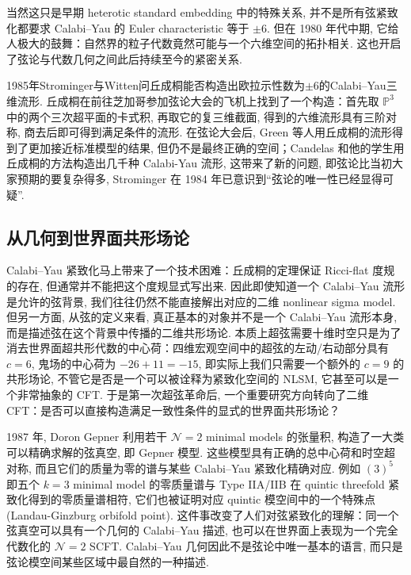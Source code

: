 \documentclass[10pt]{article}
\numberwithin{equation}{section}
\begin{document}
当然这只是早期 heterotic standard embedding 中的特殊关系, 并不是所有弦紧致化都要求 Calabi–Yau 的 Euler characteristic 等于 $\pm6$. 但在 1980 年代中期, 它给人极大的鼓舞：自然界的粒子代数竟然可能与一个六维空间的拓扑相关. 这也开启了弦论与代数几何之间此后持续至今的紧密关系. 

1985年Strominger与Witten问丘成桐能否构造出欧拉示性数为$\pm 6$的Calabi–Yau三维流形. 丘成桐在前往芝加哥参加弦论大会的飞机上找到了一个构造：首先取 $\mathbb{P}^3$ 中的两个三次超平面的卡式积, 再取它的复三维截面, 得到的六维流形具有三阶对称, 商去后即可得到满足条件的流形. 在弦论大会后, Green 等人用丘成桐的流形得到了更加接近标准模型的结果, 但仍不是最终正确的空间；Candelas 和他的学生用丘成桐的方法构造出几千种 Calabi-Yau 流形, 这带来了新的问题, 即弦论比当初大家预期的要复杂得多, Strominger 在 1984 年已意识到“弦论的唯一性已经显得可疑”\cite{Yau2006Spacetime,TianYau1987,CandelasDaleLutkenSchimmrigk1988}. 


\subsection{从几何到世界面共形场论}

Calabi–Yau 紧致化马上带来了一个技术困难：丘成桐的定理保证 Ricci-flat 度规的存在, 但通常并不能把这个度规显式写出来. 因此即使知道一个 Calabi–Yau 流形是允许的弦背景, 我们往往仍然不能直接解出对应的二维 nonlinear sigma model. 但另一方面, 从弦的定义来看, 真正基本的对象并不是一个 Calabi–Yau 流形本身, 而是描述弦在这个背景中传播的二维共形场论. 本质上超弦需要十维时空只是为了消去世界面超共形代数的中心荷：四维宏观空间中的超弦的左动/右动部分具有 $c=6$, 鬼场的中心荷为 $-26+11=-15$, 即实际上我们只需要一个额外的 $c=9$ 的共形场论, 不管它是否是一个可以被诠释为紧致化空间的 NLSM, 它甚至可以是一个非常抽象的 CFT. 于是第一次超弦革命后, 一个重要研究方向转向了二维 CFT：是否可以直接构造满足一致性条件的显式的世界面共形场论？

1987 年, Doron Gepner 利用若干 $\mathcal N=2$ minimal models 的张量积, 构造了一大类可以精确求解的弦真空, 即 Gepner 模型. 这些模型具有正确的总中心荷和时空超对称, 而且它们的质量为零的谱与某些 Calabi–Yau 紧致化精确对应. 例如 $(3)^5$ 即五个 $k=3$ minimal model 的零质量谱与 Type IIA/IIB 在 quintic threefold 紧致化得到的零质量谱相符, 它们也被证明对应 quintic 模空间中的一个特殊点(Landau-Ginzburg orbifold point). 这件事改变了人们对弦紧致化的理解：同一个弦真空可以具有一个几何的 Calabi–Yau 描述, 也可以在世界面上表现为一个完全代数化的 $\mathcal N=2$ SCFT. Calabi–Yau 几何因此不是弦论中唯一基本的语言, 而只是弦论模空间某些区域中最自然的一种描述\cite{Gepner1987,GreeneVafaWarner1989,Witten1993Phases}. 
\end{document}
